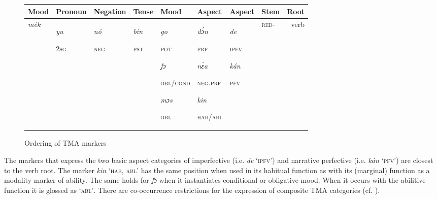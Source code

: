 \begin{figure}
\caption{Ordering of TMA markers}
\label{fig:key:6.1}
{\footnotesize\begin{tabularx}{\textwidth}{XXXX QQQ Xr}

Mood & Pronoun & Negation & Tense & Mood & Aspect & Aspect & Stem & Root\\
\midrule
{\itshape mék}

 &  \textit{yu}

\textsc{2sg} & {\itshape nó}

\textsc{neg} & {\itshape bin}

\textsc{pst} & {\itshape go}

\textsc{pot}

{\itshape fɔ}

\textsc{obl/cond}

{\itshape mɔs}

\textsc{obl} & {\itshape dɔ́n}

\textsc{prf}

{\itshape nɛ́a}

\textsc{neg}.\textsc{prf}

{\itshape kin}

\textsc{hab/abl} & {\itshape \textit{de}}

\textsc{ipfv}

{\itshape kán}

\textsc{pfv} & \textsc{red}{}- & verb\\
\end{tabularx}}
\end{figure}

The markers that express the two basic aspect categories of imperfective (i.e. \textit{de} ‘\textsc{ipfv}’) and narrative perfective (i.e. \textit{kán} ‘\textsc{pfv}’) are closest to the verb root. The marker \textit{kin} ‘\textsc{hab,} \textsc{abl}’ has the same position when used in its habitual function as with its (marginal) function as a modality marker of ability. The same holds for \textit{fɔ} when it instantiates conditional or obligative mood. When it occurs with the abilitive function it is glossed as ‘\textsc{abl’}. There are co-occurrence restrictions for the expression of composite TMA categories (cf. ). 


